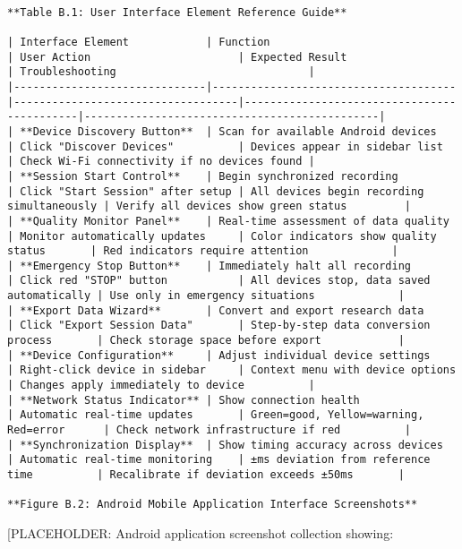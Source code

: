 \documentclass[11pt,a4paper]{report}
\begin{document}
\begin{verbatim}

**Table B.1: User Interface Element Reference Guide**

| Interface Element            | Function                             | User Action                       | Expected Result                            | Troubleshooting                              |
|------------------------------|--------------------------------------|-----------------------------------|--------------------------------------------|----------------------------------------------|
| **Device Discovery Button**  | Scan for available Android devices   | Click "Discover Devices"          | Devices appear in sidebar list             | Check Wi-Fi connectivity if no devices found |
| **Session Start Control**    | Begin synchronized recording         | Click "Start Session" after setup | All devices begin recording simultaneously | Verify all devices show green status         |
| **Quality Monitor Panel**    | Real-time assessment of data quality | Monitor automatically updates     | Color indicators show quality status       | Red indicators require attention             |
| **Emergency Stop Button**    | Immediately halt all recording       | Click red "STOP" button           | All devices stop, data saved automatically | Use only in emergency situations             |
| **Export Data Wizard**       | Convert and export research data     | Click "Export Session Data"       | Step-by-step data conversion process       | Check storage space before export            |
| **Device Configuration**     | Adjust individual device settings    | Right-click device in sidebar     | Context menu with device options           | Changes apply immediately to device          |
| **Network Status Indicator** | Show connection health               | Automatic real-time updates       | Green=good, Yellow=warning, Red=error      | Check network infrastructure if red          |
| **Synchronization Display**  | Show timing accuracy across devices  | Automatic real-time monitoring    | ±ms deviation from reference time          | Recalibrate if deviation exceeds ±50ms       |

**Figure B.2: Android Mobile Application Interface Screenshots**

\end{verbatim}
[PLACEHOLDER: Android application screenshot collection showing:
\end{document}
